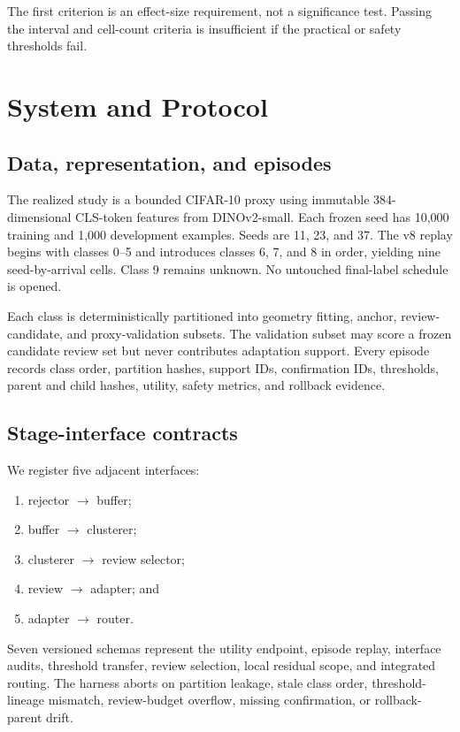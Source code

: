 \documentclass[10pt]{article}
\begin{document}
The first criterion is an effect-size requirement, not a significance test.
Passing the interval and cell-count criteria is insufficient if the practical
or safety thresholds fail.

\section{System and Protocol}

\subsection{Data, representation, and episodes}

The realized study is a bounded CIFAR-10 proxy using immutable
384-dimensional CLS-token features from DINOv2-small. Each frozen seed has
10,000 training and 1,000 development examples. Seeds are 11, 23, and 37.
The v8 replay begins with classes 0--5 and introduces classes 6, 7, and 8 in
order, yielding nine seed-by-arrival cells. Class 9 remains unknown. No
untouched final-label schedule is opened.

Each class is deterministically partitioned into geometry fitting, anchor,
review-candidate, and proxy-validation subsets. The validation subset may
score a frozen candidate review set but never contributes adaptation support.
Every episode records class order, partition hashes, support IDs, confirmation
IDs, thresholds, parent and child hashes, utility, safety metrics, and rollback
evidence.

\subsection{Stage-interface contracts}

We register five adjacent interfaces:

\begin{enumerate}
  \item rejector $\rightarrow$ buffer;
  \item buffer $\rightarrow$ clusterer;
  \item clusterer $\rightarrow$ review selector;
  \item review $\rightarrow$ adapter; and
  \item adapter $\rightarrow$ router.
\end{enumerate}

Seven versioned schemas represent the utility endpoint, episode replay,
interface audits, threshold transfer, review selection, local residual scope,
and integrated routing. The harness aborts on partition leakage, stale class
order, threshold-lineage mismatch, review-budget overflow, missing
confirmation, or rollback-parent drift.
\end{document}
